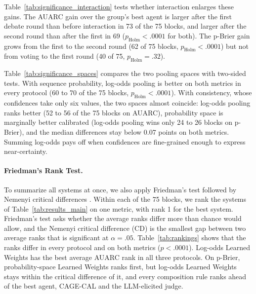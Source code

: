 Table~\ref{tab:significance_interaction} tests whether interaction enlarges these gains. The AUARC gain over the group's best agent is larger after the first debate round than before interaction in 73 of the 75 blocks, and larger after the second round than after the first in 69 ($p_{\mathrm{Holm}}<.0001$ for both). The p-Brier gain grows from the first to the second round (62 of 75 blocks, $p_{\mathrm{Holm}}<.0001$) but not from voting to the first round (40 of 75, $p_{\mathrm{Holm}}=.32$).

Table~\ref{tab:significance_spaces} compares the two pooling spaces with two-sided tests. With sequence probability, log-odds pooling is better on both metrics in every protocol (60 to 70 of the 75 blocks, $p_{\mathrm{Holm}}<.0001$). With consistency, whose confidences take only six values, the two spaces almost coincide: log-odds pooling ranks better (52 to 56 of the 75 blocks on AUARC), probability space is marginally better calibrated (log-odds pooling wins only 24 to 26 blocks on p-Brier), and the median differences stay below 0.07 points on both metrics. Summing log-odds pays off when confidences are fine-grained enough to express near-certainty.

\paragraph{Friedman's Rank Test.}
To summarize all systems at once, we also apply Friedman's test followed by Nemenyi critical differences \citep{friedman1937ranks,nemenyi1963distribution,demsar2006statistical}. Within each of the 75 blocks, we rank the systems of Table~\ref{tab:results_main} on one metric, with rank 1 for the best system. Friedman's test asks whether the average ranks differ more than chance would allow, and the Nemenyi critical difference (CD) is the smallest gap between two average ranks that is significant at $\alpha=.05$. Table~\ref{tab:rankings} shows that the ranks differ in every protocol and on both metrics ($p<.0001$). Log-odds Learned Weights has the best average AUARC rank in all three protocols. On p-Brier, probability-space Learned Weights ranks first, but log-odds Learned Weights stays within the critical difference of it, and every composition rule ranks ahead of the best agent, CAGE-CAL and the LLM-elicited judge.
